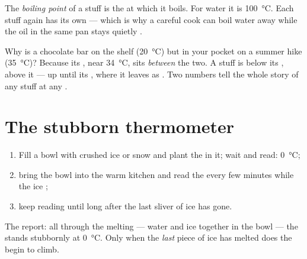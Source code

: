 \begin{definition}\label{def:g4:changes-of-state:boiling-point}
The \emph{boiling point} of a stuff is the
 at which it boils. For water it is \qty{100}{\celsius}.
Each stuff again has its own --- which is why a careful cook can
boil water away while the oil in the same pan stays quietly .
\end{definition}

\begin{example}\label{ex:g4:changes-of-state:reading}
Why is a chocolate bar  on the shelf (\qty{20}{\celsius}) but
 in your pocket on a summer hike (\qty{35}{\celsius})? Because
its , near \qty{34}{\celsius}, sits \emph{between} the
two. A stuff is  below its ,  above it ---
up until its , where it leaves as . Two numbers tell
the whole story of any stuff at any .
\end{example}

\section{The stubborn thermometer}

\begin{method}\label{met:g4:changes-of-state:watch}
\begin{enumerate}
  \item Fill a bowl with crushed ice or snow and plant the
         in it; wait and read: \qty{0}{\celsius};
  \item bring the bowl into the warm kitchen and read the
         every few minutes while the ice ;
  \item keep reading until long after the last sliver of ice has
        gone.
\end{enumerate}
The report: all through the melting --- water and ice together in
the bowl --- the  stands stubbornly at \qty{0}{\celsius}.
Only when the \emph{last} piece of ice has melted does the
 begin to climb.
\end{method}

